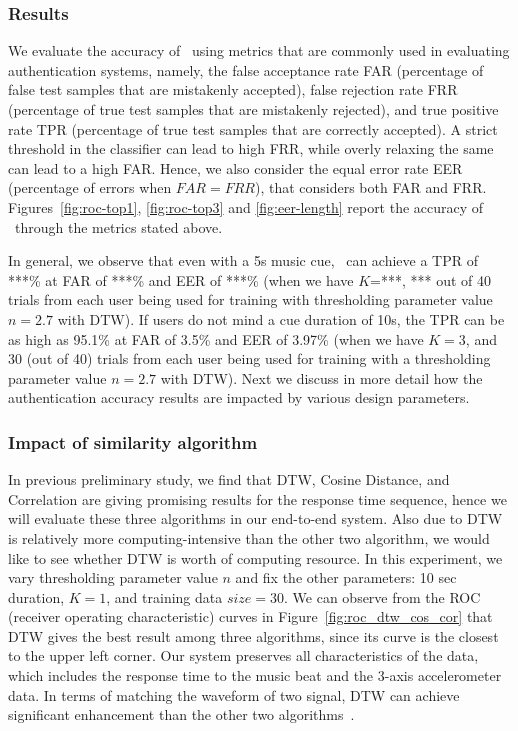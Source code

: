 \subsubsection{Results}
We evaluate the accuracy of \systemname~using metrics that are commonly used
in evaluating authentication systems, namely,
the false acceptance rate FAR (percentage of false test samples that are
mistakenly accepted), false rejection rate FRR (percentage of true test
samples that are mistakenly rejected), and true positive rate
TPR (percentage of true test samples that are correctly accepted).
A strict threshold in the classifier can lead to high FRR, while
overly relaxing the same can lead to a high FAR. Hence, we also consider
the equal error rate EER (percentage of errors when $FAR = FRR$), that
considers both FAR and FRR.
Figures~\ref{fig:roc-top1}, \ref{fig:roc-top3} and \ref{fig:eer-length} report
the accuracy
of \systemname~through the metrics stated above.

In general, we observe that even with a 5s music cue, \systemname~can achieve a TPR of ***\% at FAR of ***\% and EER of ***\% (when we have $K$=***, *** out of 40 trials from each user being used for training with  thresholding parameter value $n = 2.7$ with DTW). If users do not mind a cue duration of 10s, the TPR can be as high as 95.1\% at FAR of 3.5\% and EER of 3.97\% (when we have $K = 3$, and 30 (out of 40) trials from each user being used for training with a thresholding parameter value $n = 2.7$ with DTW). 
Next we discuss in more detail how the authentication accuracy results are impacted by various design parameters.  

\subsubsection{Impact of similarity algorithm}
In previous preliminary study, we find that DTW, Cosine Distance, and Correlation are giving promising results for the response time sequence, hence we will evaluate these three algorithms in our end-to-end system. Also due to DTW is relatively more computing-intensive than the other two algorithm, we would like to see whether DTW  is worth of computing resource. In this experiment, we vary thresholding parameter value $n$ and fix the other parameters: 10 sec duration, $K = 1$, and  training data $size = 30$. We can observe from the ROC
(receiver operating characteristic) curves in Figure~\ref{fig:roc_dtw_cos_cor} that DTW gives the best result among three algorithms, since its curve is the closest to the upper left corner. Our system preserves all characteristics of the data, which includes the response time to the music beat and the 3-axis accelerometer data. In terms of matching the waveform of two signal, DTW can achieve significant enhancement than the other two algorithms~\cite{DTW}.
